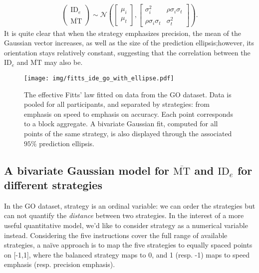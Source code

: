 \documentclass[12pt,a4paper]{article}
\newcommand{\mmt}{\ensuremath{\overline{\text{MT}}}\xspace}
\newcommand{\ide}{\ensuremath{{\text{ID}_e}}\xspace}
\begin{document}
\begin{align}
	\begin{pmatrix}
		\ide \\
		\mmt
	\end{pmatrix} \sim \mathcal{N} \left( \begin{bmatrix}
			                                      \mu_i \\
			                                      \mu_t
		                                      \end{bmatrix}, \begin{bmatrix}
			                                                     \sigma^2_i             & \rho \sigma_i \sigma_t \\
			                                                     \rho \sigma_i \sigma_t & \sigma_t^2
		                                                     \end{bmatrix} \right). \label{eq:gaussian_ide_mt}
\end{align}
It is quite clear that when the strategy emphasizes precision, the mean of the Gaussian vector increases, as well as the size of the prediction ellipsis;however, its orientation stays relatively constant, suggesting that the correlation between the \ide and \mmt may also be.

\begin{figure}[htbp]
	\centering
	\texttt{[image: img/fitts\_ide\_go\_with\_ellipse.pdf]}
	\caption{The effective Fitts' law fitted on data from the GO dataset. Data is pooled for all participants, and separated by strategies: from emphasis on speed to emphasis on accuracy. Each point corresponds to a block aggregate. A bivariate Gaussian fit, computed for all points of the same strategy, is also displayed through the associated $95\%$ prediction ellipsis.}
	\label{fig:go_ide}
\end{figure}



\subsection{A bivariate Gaussian model for \mmt and \ide for different strategies}
In the GO dataset, strategy is an ordinal variable: we can order the strategies but can not quantify the \textit{distance} between two strategies. In the interest of a more useful quantitative model, we'd like to consider strategy as a numerical variable instead. Considering the five instructions cover the full range of available strategies, a naïve approach is to map the five strategies to equally spaced points on [-1,1], where the balanced strategy maps to 0, and 1 (resp. -1) maps to speed emphasis (resp. precision emphasis).
\end{document}
